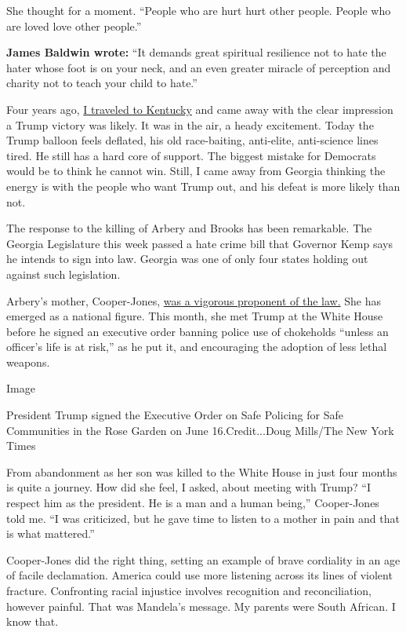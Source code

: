 She thought for a moment. ``People who are hurt hurt other people.
People who are loved love other people.''

\textbf{James Baldwin wrote:} ``It demands great spiritual resilience
not to hate the hater whose foot is on your neck, and an even greater
miracle of perception and charity not to teach your child to hate.''

Four years ago,
\href{https://www.nytimes3xbfgragh.onion/2016/09/11/opinion/sunday/we-need-somebody-spectacular-views-from-trump-country.html}{I
traveled to Kentucky} and came away with the clear impression a Trump
victory was likely. It was in the air, a heady excitement. Today the
Trump balloon feels deflated, his old race-baiting, anti-elite,
anti-science lines tired. He still has a hard core of support. The
biggest mistake for Democrats would be to think he cannot win. Still, I
came away from Georgia thinking the energy is with the people who want
Trump out, and his defeat is more likely than not.

The response to the killing of Arbery and Brooks has been remarkable.
The Georgia Legislature this week passed a hate crime bill that Governor
Kemp says he intends to sign into law. Georgia was one of only four
states holding out against such legislation.

Arbery's mother, Cooper-Jones,
\href{https://www.nytimes3xbfgragh.onion/2020/06/09/opinion/hate-crime-bill-ahmaud-arbery.html}{was
a vigorous proponent of the law.} She has emerged as a national figure.
This month, she met Trump at the White House before he signed an
executive order banning police use of chokeholds ``unless an officer's
life is at risk,'' as he put it, and encouraging the adoption of less
lethal weapons.

Image

President Trump signed the Executive Order on Safe Policing for Safe
Communities in the Rose Garden on June 16.Credit...Doug Mills/The New
York Times

From abandonment as her son was killed to the White House in just four
months is quite a journey. How did she feel, I asked, about meeting with
Trump? ``I respect him as the president. He is a man and a human
being,'' Cooper-Jones told me. ``I was criticized, but he gave time to
listen to a mother in pain and that is what mattered.''

Cooper-Jones did the right thing, setting an example of brave cordiality
in an age of facile declamation. America could use more listening across
its lines of violent fracture. Confronting racial injustice involves
recognition and reconciliation, however painful. That was Mandela's
message. My parents were South African. I know that.

